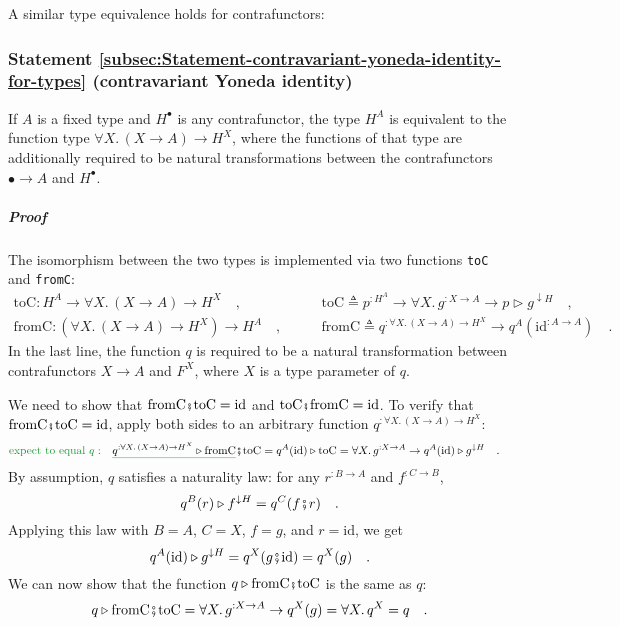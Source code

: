 A similar type equivalence holds for contrafunctors:

\subsubsection{Statement \label{subsec:Statement-contravariant-yoneda-identity-for-types}\ref{subsec:Statement-contravariant-yoneda-identity-for-types}
(contravariant Yoneda identity)}

If $A$ is a fixed type and $H^{\bullet}$ is any contrafunctor, the
type $H^{A}$ is equivalent to the function type $\forall X.\,(X\rightarrow A)\rightarrow H^{X}$,
where the functions of that type are additionally required to be natural
transformations between the contrafunctors $\bullet\rightarrow A$
and $H^{\bullet}$.

\subparagraph{Proof}

The isomorphism between the two types is implemented via two functions
\lstinline!toC! and \lstinline!fromC!:
\begin{align*}
\text{toC}:H^{A}\rightarrow\forall X.\,(X\rightarrow A)\rightarrow H^{X}\quad, & \quad\quad\text{toC}\triangleq p^{:H^{A}}\rightarrow\forall X.\,g^{:X\rightarrow A}\rightarrow p\triangleright g^{\downarrow H}\quad,\\
\text{fromC}:(\forall X.\,(X\rightarrow A)\rightarrow H^{X})\rightarrow H^{A}\quad, & \quad\quad\text{fromC}\triangleq q^{:\forall X.\,(X\rightarrow A)\rightarrow H^{X}}\rightarrow q^{A}(\text{id}^{:A\rightarrow A})\quad.
\end{align*}
In the last line, the function $q$ is required to be a natural transformation
between contrafunctors $X\rightarrow A$ and $F^{X}$, where $X$
is a type parameter of $q$.

We need to show that $\text{fromC}\bef\text{toC}=\text{id}$ and $\text{toC}\bef\text{fromC}=\text{id}$.
To verify that $\text{fromC}\bef\text{toC}=\text{id}$, apply both
sides to an arbitrary function $q^{:\forall X.\,(X\rightarrow A)\rightarrow H^{X}}$:
\begin{align*}
{\color{greenunder}\text{expect to equal }q:}\quad & \gunderline{q^{:\forall X.\,(X\rightarrow A)\rightarrow H^{X}}\triangleright\text{fromC}}\bef\text{toC}=q^{A}(\text{id})\triangleright\text{toC}=\forall X.\,g^{:X\rightarrow A}\rightarrow q^{A}(\text{id})\triangleright g^{\downarrow H}\quad.
\end{align*}
By assumption, $q$ satisfies a naturality law: for any $r^{:B\rightarrow A}$
and $f^{:C\rightarrow B}$, 
\begin{equation}
q^{B}(r)\triangleright f^{\downarrow H}=q^{C}(f\bef r)\quad.\label{eq:assumed-naturality-of-argument-q-contravariant}
\end{equation}
Applying this law with $B=A$, $C=X$, $f=g$, and $r=\text{id}$,
we get
\[
q^{A}(\text{id})\triangleright g^{\downarrow H}=q^{X}(g\bef\text{id})=q^{X}(g)\quad.
\]
We can now show that the function $q\triangleright\text{fromC}\bef\text{toC}$
is the same as $q$:
\[
q\triangleright\text{fromC}\bef\text{toC}=\forall X.\,g^{:X\rightarrow A}\rightarrow q^{X}(g)=\forall X.\,q^{X}=q\quad.
\]


